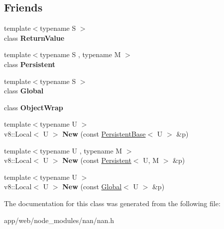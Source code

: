 \subsection*{Friends}
\begin{DoxyCompactItemize}
\item 
\mbox{\label{class_nan_1_1_persistent_base_a53f604d3d6f2dc0647df33c9979f116a}} 
{\footnotesize template$<$typename S $>$ }\\class {\bfseries Return\+Value}
\item 
\mbox{\label{class_nan_1_1_persistent_base_ad845ec8872174be0a9ca9a3dd1898d30}} 
{\footnotesize template$<$typename S , typename M $>$ }\\class {\bfseries Persistent}
\item 
\mbox{\label{class_nan_1_1_persistent_base_adc49d0fc7441cf7e3b5f039334e44243}} 
{\footnotesize template$<$typename S $>$ }\\class {\bfseries Global}
\item 
\mbox{\label{class_nan_1_1_persistent_base_aa768a749e991f292d109b060d1c74f75}} 
class {\bfseries Object\+Wrap}
\item 
\mbox{\label{class_nan_1_1_persistent_base_a871dabd1b6ac9eb7dcffa832c3310aec}} 
{\footnotesize template$<$typename U $>$ }\\v8\+::\+Local$<$ U $>$ {\bfseries New} (const \hyperlink{class_nan_1_1_persistent_base}{Persistent\+Base}$<$ U $>$ \&p)
\item 
\mbox{\label{class_nan_1_1_persistent_base_aeffcba0d3279a5385f16e575a0eac558}} 
{\footnotesize template$<$typename U , typename M $>$ }\\v8\+::\+Local$<$ U $>$ {\bfseries New} (const \hyperlink{class_nan_1_1_persistent}{Persistent}$<$ U, M $>$ \&p)
\item 
\mbox{\label{class_nan_1_1_persistent_base_a2843d3677825f486a341bf8ef4f91771}} 
{\footnotesize template$<$typename U $>$ }\\v8\+::\+Local$<$ U $>$ {\bfseries New} (const \hyperlink{class_nan_1_1_global}{Global}$<$ U $>$ \&p)
\end{DoxyCompactItemize}


The documentation for this class was generated from the following file\+:\begin{DoxyCompactItemize}
\item 
app/web/node\+\_\+modules/nan/nan.\+h\end{DoxyCompactItemize}

